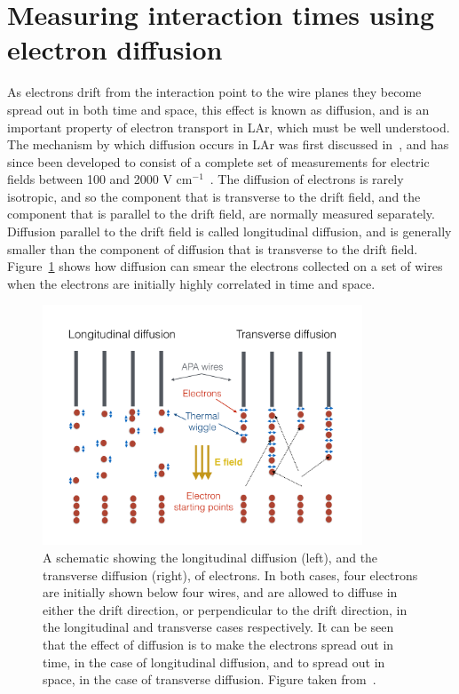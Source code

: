 \section{Measuring interaction times using electron diffusion}  \label{sec:DiffusionAnalysis}%
As electrons drift from the interaction point to the wire planes they become spread out in both time and space, this effect is known as diffusion, and is an important property of electron transport in LAr, which must be well understood. The mechanism by which diffusion occurs in LAr was first discussed in~\citep{1974NucIM.122..319D, Derenzo, PhysRevA.20.2547, Atrazhev-Timoshkin}, and has since been developed to consist of a complete set of measurements for electric fields between 100 and 2000 V cm$^{-1}$~\citep{Li:2015rqa}. The diffusion of electrons is rarely isotropic, and so the component that is transverse to the drift field, and the component that is parallel to the drift field, are normally measured separately. Diffusion parallel to the drift field is called longitudinal diffusion, and is generally smaller than the component of diffusion that is transverse to the drift field. Figure~\ref{fig:DomDiffSchem} shows how diffusion can smear the electrons collected on a set of wires when the electrons are initially highly correlated in time and space. \\

\begin{figure}
  \centering
  \includegraphics[width=0.85\textwidth]{DiffusionSchematic}
  \caption[Schematic showing the process of diffusion]
          {A schematic showing the longitudinal diffusion (left), and the transverse diffusion (right), of electrons. In both cases, four electrons are initially shown below four wires, and are allowed to diffuse in either the drift direction, or perpendicular to the drift direction, in the longitudinal and transverse cases respectively. It can be seen that the effect of diffusion is to make the electrons spread out in time, in the case of longitudinal diffusion, and to spread out in space, in the case of transverse diffusion. Figure taken from~\citep{DomSeptMeeting}.}
  \label{fig:DomDiffSchem}
\end{figure}

